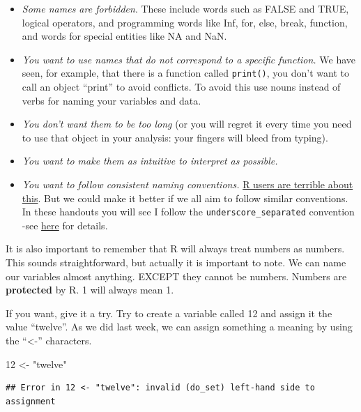 \documentclass[
]{book}
\newenvironment{Shaded}{\begin{snugshade}}{\end{snugshade}}
\newcommand{\DecValTok}[1]{\textcolor[rgb]{0.00,0.00,0.81}{#1}}
\newcommand{\OtherTok}[1]{\textcolor[rgb]{0.56,0.35,0.01}{#1}}
\newcommand{\StringTok}[1]{\textcolor[rgb]{0.31,0.60,0.02}{#1}}
\begin{document}
\begin{itemize}
\item
  \emph{Some names are forbidden}. These include words such as FALSE and TRUE, logical operators, and programming words like Inf, for, else, break, function, and words for special entities like NA and NaN.
\item
  \emph{You want to use names that do not correspond to a specific function.} We have seen, for example, that there is a function called \texttt{print()}, you don't want to call an object ``print'' to avoid conflicts. To avoid this use nouns instead of verbs for naming your variables and data.
\item
  \emph{You don't want them to be too long} (or you will regret it every time you need to use that object in your analysis: your fingers will bleed from typing).
\item
  \emph{You want to make them as intuitive to interpret as possible.}
\item
  \emph{You want to follow consistent naming conventions.} \href{http://journal.r-project.org/archive/2012-2/RJournal_2012-2_Baaaath.pdf}{R users are terrible about this}. But we could make it better if we all aim to follow similar conventions. In these handouts you will see I follow the \texttt{underscore\_separated} convention -see \href{https://style.tidyverse.org/syntax.html}{here} for details.
\end{itemize}

It is also important to remember that R will always treat numbers as numbers. This sounds straightforward, but actually it is important to note. We can name our variables almost anything. EXCEPT they cannot be numbers. Numbers are \textbf{protected} by R. 1 will always mean 1.

If you want, give it a try. Try to create a variable called 12 and assign it the value ``twelve''. As we did last week, we can assign something a meaning by using the ``\textless-'' characters.

\begin{Shaded}
\begin{Highlighting}[]
\DecValTok{12} \OtherTok{\textless{}{-}} \StringTok{"twelve"}
\end{Highlighting}
\end{Shaded}

\begin{verbatim}
## Error in 12 <- "twelve": invalid (do_set) left-hand side to assignment
\end{verbatim}
\end{document}
